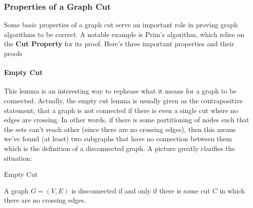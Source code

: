 \documentclass{standalone}
\begin{document}
\subsubsection{Properties of a Graph Cut}

Some basic properties of a graph cut serve an important role in proving graph
algorithms to be correct. A notable example is Prim's algorithm, which relies
on the \textbf{Cut Property} for its proof. Here's three important properties
and their proofs

\paragraph{Empty Cut}

This lemma is an interesting way to rephrase what it means for a graph to be
connected. Actually, the empty cut lemma is usually given as the contrapositive
statement, that a graph is not connected if there is even a single cut where no
edges are crossing. In other words, if there is some partitioning of nodes such
that the sets can't reach other (since there are no crossing edges), then this
means we've found (at least) two subgraphs that have no connection between them
which is the definition of a disconnected graph. A picture greatly clarifies the
situation:


\begin{lemma} \label{lem:emptycut}
  Empty Cut

  A graph $G = (V, E)$ is disconnected if and only if there is some cut $C$ in
  which there are no crossing edges.
\end{lemma}
\end{document}
